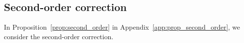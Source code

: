 \subsection{Second-order correction}
In Proposition~\ref{prop:second_order} in Appendix~\ref{app:prop_second_order}, we consider the second-order correction.
